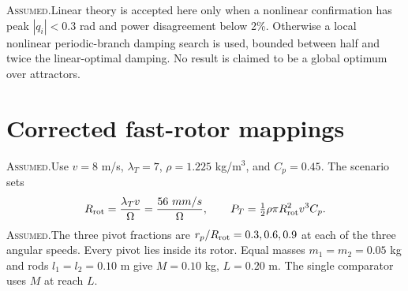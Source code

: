 \documentclass[10pt,a4paper]{article}
\newcommand{\A}{\textcolor{accent}{\textsc{Assumed.}}\enspace}
\newcommand{\page}[1]{\clearpage\section{#1}}
\begin{document}
\A Linear theory is accepted here only when a nonlinear confirmation has peak $|q_i|<0.3$ rad and power disagreement below 2\%. Otherwise a local nonlinear periodic-branch damping search is used, bounded between half and twice the linear-optimal damping. No result is claimed to be a global optimum over attractors.

\page{Corrected fast-rotor mappings}
\A Use $v=8$ m/s, $\lambda_T=7$, $\rho=1.225$ kg/m$^3$, and $C_p=0.45$. The scenario sets
\begin{equation}
R_{\rm rot}=\frac{\lambda_Tv}{\Omega}=\frac{56\ {
m m/s}}{\Omega},\qquad
P_T=\tfrac12\rho\pi R_{\rm rot}^2v^3C_p.
\end{equation}
\A The three pivot fractions are $r_p/R_{\rm rot}=0.3,0.6,0.9$ at each of the three angular speeds. Every pivot lies inside its rotor. Equal masses $m_1=m_2=0.05$ kg and rods $l_1=l_2=0.10$ m give $M=0.10$ kg, $L=0.20$ m. The single comparator uses $M$ at reach $L$.
\end{document}

